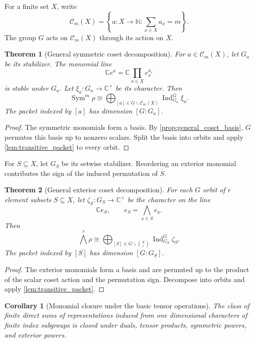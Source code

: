 \documentclass{aomart}
\newtheorem{theorem}{Theorem}[section]
\newtheorem{corollary}[corollary]{Corollary}
\theoremstyle{definition}
\theoremstyle{remark}
\newcommand{\CC}{\mathbb C}
\newcommand{\NN}{\mathbb N}
\newcommand{\Ind}{\operatorname{Ind}}
\newcommand{\Sym}{\operatorname{Sym}}
\newcommand{\calC}{\mathcal C}
\begin{document}
For a finite set \(X\), write
\[
\calC_m(X)
=
\left\{
 a:X\to\NN:
 \sum_{x\in X}a_x=m
\right\}.
\]
The group \(G\) acts on \(\calC_m(X)\) through its action on \(X\).

\begin{theorem}[General symmetric coset decomposition]\label{thm:general_symmetric_coset}
For \(a\in\calC_m(X)\), let \(G_a\) be its stabilizer. The monomial line
\[
\CC e^a
=
\CC\prod_{x\in X}e_x^{a_x}
\]
is stable under \(G_a\). Let \(\xi_a:G_a\to\CC^\times\) be its character. Then
\[
\boxed{
\Sym^m\rho
\cong
\bigoplus_{[a]\in G\backslash\calC_m(X)}
\Ind_{G_a}^G\xi_a.
}
\]
The packet indexed by \([a]\) has dimension \([G:G_a]\).
\end{theorem}

\begin{proof}
The symmetric monomials form a basis. By \cref{prop:general_coset_basis}, \(G\) permutes this basis up to nonzero scalars. Split the basis into orbits and apply \cref{lem:transitive_packet} to every orbit.
\end{proof}

For \(S\subseteq X\), let \(G_S\) be its setwise stabilizer. Reordering an exterior monomial contributes the sign of the induced permutation of \(S\).

\begin{theorem}[General exterior coset decomposition]\label{thm:general_exterior_coset}
For each \(G\) orbit of \(r\) element subsets \(S\subseteq X\), let \(\zeta_S:G_S\to\CC^\times\) be the character on the line
\[
\CC e_S,
\qquad
 e_S=\bigwedge_{x\in S}e_x.
\]
Then
\[
\boxed{
\bigwedge^r\rho
\cong
\bigoplus_{[S]\in G\backslash\binom{X}{r}}
\Ind_{G_S}^G\zeta_S.
}
\]
The packet indexed by \([S]\) has dimension \([G:G_S]\).
\end{theorem}

\begin{proof}
The exterior monomials form a basis and are permuted up to the product of the scalar coset action and the permutation sign. Decompose into orbits and apply \cref{lem:transitive_packet}.
\end{proof}

\begin{corollary}[Monomial closure under the basic tensor operations]\label{cor:monomial_basic_closure}
The class of finite direct sums of representations induced from one dimensional characters of finite index subgroups is closed under duals, tensor products, symmetric powers, and exterior powers.
\end{corollary}
\end{document}
